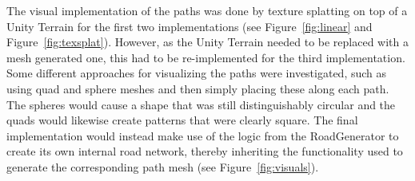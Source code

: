The visual implementation of the paths was done by texture splatting on top of a Unity Terrain for the first two implementations (see Figure~\ref{fig:linear} and Figure~\ref{fig:texsplat}).
However, as the Unity Terrain needed to be replaced with a mesh generated one, this had to be re-implemented for the third implementation.
Some different approaches for visualizing the paths were investigated, such as using quad and sphere meshes and then simply placing these along each path.
The spheres would cause a shape that was still distinguishably circular and the quads would likewise create patterns that were clearly square. 
The final implementation would instead make use of the logic from the RoadGenerator to create its own internal road network, thereby inheriting the functionality used to generate the corresponding path mesh (see Figure~\ref{fig:visuals}).
